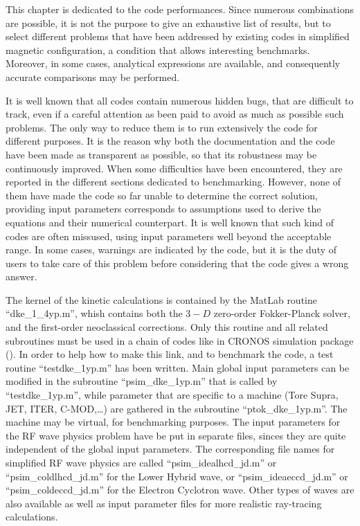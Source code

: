 

This chapter is dedicated to the code performances. Since numerous
combinations are possible, it is not the purpose to give an exhaustive list
of results, but to select different problems that have been addressed by
existing codes in simplified magnetic configuration, a condition that allows
interesting benchmarks. Moreover, in some cases, analytical expressions are
available, and consequently accurate comparisons may be performed.

It is well known that all codes contain numerous hidden bugs, that are
difficult to track, even if a careful attention as been paid to avoid as
much as possible such problems. The only way to reduce them is to run
extensively the code for different purposes. It is the reason why both the
documentation and the code have been made as transparent as possible, so
that its robustness may be continuously improved. When some difficulties
have been encountered, they are reported in the different sections dedicated
to benchmarking. However, none of them have made the code so far unable to
determine the correct solution, providing input parameters corresponds to
assumptions used to derive the equations and their numerical counterpart. It
is well known that such kind of codes are often missused, using input
parameters well beyond the acceptable range. In some cases, warnings are
indicated by the code, but it is the duty of users to take care of this
problem before considering that the code gives a wrong answer.

The kernel of the kinetic calculations is contained by the MatLab routine
``dke\_1\_4yp.m'', whish contains both the $3-D$ zero-order Fokker-Planck
solver, and the first-order neoclassical corrections. Only this routine and
all related subroutines must be used in a chain of codes like in CRONOS
simulation package (\cite{bas03}). In order to help how to make this link,
and to benchmark the code, a test routine ``testdke\_1yp.m'' has been
written. Main global input parameters can be modified in the subroutine
``psim\_dke\_1yp.m'' that is called by ``testdke\_1yp.m'', while parameter
that are specific to a machine (Tore Supra, JET, ITER, C-MOD,\ldots ) are
gathered in the subroutine ``ptok\_dke\_1yp.m''. The machine may be virtual,
for benchmarking purposes. The input parameters for the RF wave physics
problem have be put in separate files, sinces they are quite independent of
the global input parameters. The corresponding file names for simplified RF
wave physics are called ``psim\_idealhcd\_jd.m'' or ``psim\_coldlhcd\_jd.m''
for the Lower Hybrid wave, or ``psim\_ideaeccd\_jd.m'' or
``psim\_coldeccd\_jd.m'' for the Electron Cyclotron wave. Other types of
waves are also available as well as input parameter files for more realistic
ray-tracing calculations.


